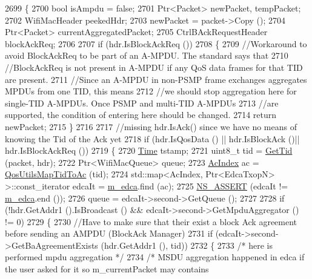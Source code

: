 \begin{DoxyCode}
2699 \{
2700   \textcolor{keywordtype}{bool} isAmpdu = \textcolor{keyword}{false};
2701   Ptr<Packet> newPacket, tempPacket;
2702   WifiMacHeader peekedHdr;
2703   newPacket = packet->Copy ();
2704   Ptr<Packet> currentAggregatedPacket;
2705   CtrlBAckRequestHeader blockAckReq;
2706 
2707   \textcolor{keywordflow}{if} (hdr.IsBlockAckReq ())
2708     \{
2709       \textcolor{comment}{//Workaround to avoid BlockAckReq to be part of an A-MPDU. The standard says that}
2710       \textcolor{comment}{//BlockAckReq is not present in A-MPDU if any QoS data frames for that TID are present.}
2711       \textcolor{comment}{//Since an A-MPDU in non-PSMP frame exchanges aggregates MPDUs from one TID, this means}
2712       \textcolor{comment}{//we should stop aggregation here for single-TID A-MPDUs. Once PSMP and multi-TID A-MPDUs}
2713       \textcolor{comment}{//are supported, the condition of entering here should be changed.}
2714       \textcolor{keywordflow}{return} newPacket;
2715     \}
2716 
2717   \textcolor{comment}{//missing hdr.IsAck() since we have no means of knowing the Tid of the Ack yet}
2718   \textcolor{keywordflow}{if} (hdr.IsQosData () || hdr.IsBlockAck ()|| hdr.IsBlockAckReq ())
2719     \{
2720       \hyperlink{namespacens3_1_1TracedValueCallback_a7ffd3e7c142ffe7c8a1d2db9b8de38ec}{Time} tstamp;
2721       uint8\_t tid = \hyperlink{group__wifi_ga92cc18e2c5aa6bed3728860bbad76ff8}{GetTid} (packet, hdr);
2722       Ptr<WifiMacQueue> queue;
2723       \hyperlink{group__wifi_gab422b4562ba272b39a9b6bca3513f3ac}{AcIndex} ac = \hyperlink{group__wifi_ga4e36efcff6dd83eaee42e1af0de43d48}{QosUtilsMapTidToAc} (tid);
2724       std::map<AcIndex, Ptr<EdcaTxopN> >::const\_iterator edcaIt = \hyperlink{classns3_1_1MacLow_a754751ba4152c9337611a5f015045a44}{m\_edca}.find (ac);
2725       \hyperlink{assert_8h_a6dccdb0de9b252f60088ce281c49d052}{NS\_ASSERT} (edcaIt != \hyperlink{classns3_1_1MacLow_a754751ba4152c9337611a5f015045a44}{m\_edca}.end ());
2726       queue = edcaIt->second->GetQueue ();
2727 
2728       \textcolor{keywordflow}{if} (!hdr.GetAddr1 ().IsBroadcast () && edcaIt->second->GetMpduAggregator () != 0)
2729         \{
2730           \textcolor{comment}{//Have to make sure that their exist a block Ack agreement before sending an AMPDU (BlockAck
       Manager)}
2731           \textcolor{keywordflow}{if} (edcaIt->second->GetBaAgreementExists (hdr.GetAddr1 (), tid))
2732             \{
2733               \textcolor{comment}{/* here is performed mpdu aggregation */}
2734               \textcolor{comment}{/* MSDU aggregation happened in edca if the user asked for it so m\_currentPacket may contains
}
\end{DoxyCode}

